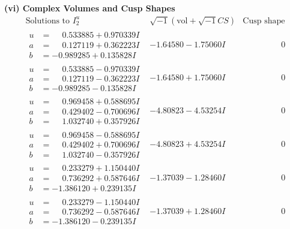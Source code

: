 \documentclass[1p]{elsarticle_modified}
\theoremstyle{definition}
\newcommand{\I}{\sqrt{-1}}
\begin{document}
\newpage\flushleft \textbf{(vi) Complex Volumes and Cusp Shapes}
$$\begin{array}{c|c|c}  
\text{Solutions to }I^u_{2}& \I (\text{vol} + \sqrt{-1}CS) & \text{Cusp shape}\\
 \hline 
\begin{aligned}
u &= \phantom{-}0.533885 + 0.970339 I \\
a &= \phantom{-}0.127119 + 0.362223 I \\
b &= -0.989285 + 0.135828 I\end{aligned}
 & -1.64580 - 1.75060 I & \phantom{-0.000000 } 0 \\ \hline\begin{aligned}
u &= \phantom{-}0.533885 - 0.970339 I \\
a &= \phantom{-}0.127119 - 0.362223 I \\
b &= -0.989285 - 0.135828 I\end{aligned}
 & -1.64580 + 1.75060 I & \phantom{-0.000000 } 0 \\ \hline\begin{aligned}
u &= \phantom{-}0.969458 + 0.588695 I \\
a &= \phantom{-}0.429402 - 0.700696 I \\
b &= \phantom{-}1.032740 + 0.357926 I\end{aligned}
 & -4.80823 - 4.53254 I & \phantom{-0.000000 } 0 \\ \hline\begin{aligned}
u &= \phantom{-}0.969458 - 0.588695 I \\
a &= \phantom{-}0.429402 + 0.700696 I \\
b &= \phantom{-}1.032740 - 0.357926 I\end{aligned}
 & -4.80823 + 4.53254 I & \phantom{-0.000000 } 0 \\ \hline\begin{aligned}
u &= \phantom{-}0.233279 + 1.150440 I \\
a &= \phantom{-}0.736292 + 0.587646 I \\
b &= -1.386120 + 0.239135 I\end{aligned}
 & -1.37039 - 1.28460 I & \phantom{-0.000000 } 0 \\ \hline\begin{aligned}
u &= \phantom{-}0.233279 - 1.150440 I \\
a &= \phantom{-}0.736292 - 0.587646 I \\
b &= -1.386120 - 0.239135 I\end{aligned}
 & -1.37039 + 1.28460 I & \phantom{-0.000000 } 0 \\ \hline\begin{aligned}

\end{aligned}
\end{array}$$
\end{document}
